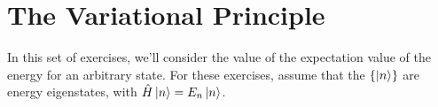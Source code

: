 %
%
%
%

\section*{The Variational Principle}

	In this set of exercises, we'll consider the value of the expectation value of the energy for an arbitrary state.  For these exercises, assume that the $\{\ket{n}\}$ are energy eigenstates, with $\hat H \ket{n} = E_n \ket{n}$.
	
